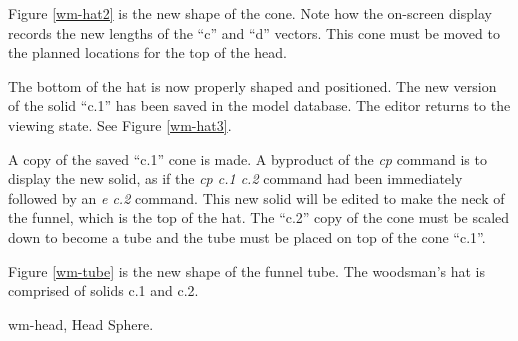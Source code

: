 
Figure \ref{wm-hat2} is the new shape of the cone.
Note how the on-screen display records the new lengths of the ``c''
and ``d'' vectors.
This cone must be moved to the planned locations for the top of the head.


The bottom of the hat is now properly shaped and positioned.  The
new version of the solid ``c.1'' has been saved in the model database.
The editor returns to the viewing state.  See Figure \ref{wm-hat3}.

A copy of the saved ``c.1'' cone is made.  A byproduct of the {\em cp}
command is to display the new solid, as if the {\em cp c.1 c.2} command
had been immediately followed by an {\em e c.2} command.
This new solid will be edited to make the neck of the funnel,
which is the top of the hat.
The ``c.2'' copy of the cone must be
scaled down to become a tube and the tube must be placed on top of the
cone ``c.1''.


Figure \ref{wm-tube} is the new shape of the funnel tube.
The woodsman's hat is comprised of solids c.1 and c.2.

\mfig wm-head, Head Sphere.
